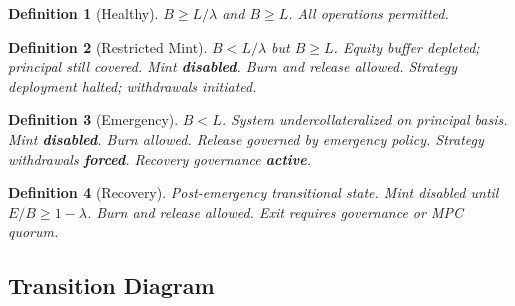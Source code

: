 \documentclass[11pt,twocolumn]{article}
\newtheorem{definition}{Definition}[section]
\theoremstyle{remark}
\begin{document}
\begin{definition}[Healthy]
$B \geq L / \lambda$ and $B \geq L$. All operations permitted.
\end{definition}

\begin{definition}[Restricted Mint]
$B < L / \lambda$ but $B \geq L$. Equity buffer depleted; principal still covered. Mint \textbf{disabled}. Burn and release allowed. Strategy deployment halted; withdrawals initiated.
\end{definition}

\begin{definition}[Emergency]
$B < L$. System undercollateralized on principal basis. Mint \textbf{disabled}. Burn allowed. Release governed by emergency policy. Strategy withdrawals \textbf{forced}. Recovery governance \textbf{active}.
\end{definition}

\begin{definition}[Recovery]
Post-emergency transitional state. Mint disabled until $E/B \geq 1 - \lambda$. Burn and release allowed. Exit requires governance or MPC quorum.
\end{definition}

\subsection{Transition Diagram}

\begin{center}
\end{center}
\end{document}
